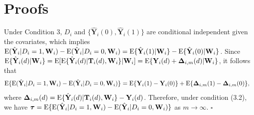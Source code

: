 \documentclass[12pt]{article}
\numberwithin{equation}{section}
\def\bea{\begin{eqnarray}}
\def\eea{\end{eqnarray}}
\def\nn{\nonumber}
\newcommand{\E}{\rm E}
\newcommand{\bT}{{\mathbf T}}
\newcommand{\bW}{{\mathbf W}}
\newcommand{\bY}{{\mathbf Y}}
\newcommand{\bDelta}{\boldsymbol{\Delta}}
\newcommand{\btau}{\boldsymbol{\tau}}
\begin{document}
\section{Proofs}

Under Condition 3, $D_i$ and $\{\hat{\bY}_{i}(0), \hat{\bY}_{i}(1)\}$ are conditional independent given the covariates, which implies 
${\E}(\hat{\bY}_{i} | D_i = 1, \bW_i) - {\E}(\hat{\bY}_{i} | D_i = 0, \bW_i) = {\E}\{\hat{\bY}_{i}(1) | \bW_i\} - {\E}\{\hat{\bY}_{i}(0) | \bW_i\}$.
Since ${\E}\{\hat{\bY}_{i}(d) | \bW_i\} = {\E}[{\E}\{\hat{\bY}_{i}(d) | \bT_i(d), \bW_i\} | \bW_i] = {\E}\{\bY_i(d) + \bDelta_{i, m}(d) | \bW_i\}$,
it follows that 
\bea
{\E}\{{\E}(\hat{\bY}_{i} | D_i = 1, \bW_i) - {\E}(\hat{\bY}_{i} | D_i = 0, \bW_i)\} = {\E}\{\bY_{i}(1) - \bY_{i}(0)\} + {\E}\{\bDelta_{i, m}(1) - \bDelta_{i, m}(0)\},
\nn
\eea
where $\bDelta_{i, m}(d) = {\E}\{\hat{\bY}_{i}(d) | \bT_i(d), \bW_i\} - \bY_{i}(d)$.
Therefore, under condition (3.2), we have
$\btau = {\E}\{{\E}(\hat{\bY}_{i} | D_i = 1, \bW_i) - {\E}(\hat{\bY}_{i} | D_i = 0, \bW_i)\}$ as $m \to \infty$. $\square$

\medskip
\end{document}
